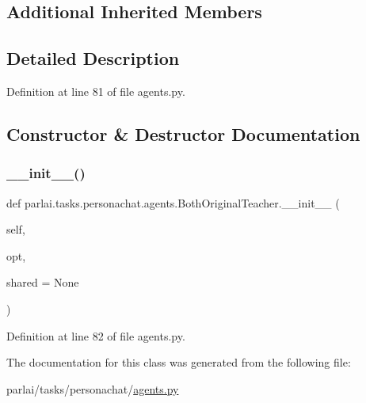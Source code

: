 \subsection*{Additional Inherited Members}


\subsection{Detailed Description}


Definition at line 81 of file agents.\+py.



\subsection{Constructor \& Destructor Documentation}
\mbox{\label{classparlai_1_1tasks_1_1personachat_1_1agents_1_1BothOriginalTeacher_a9d8162c6d1b012a1c9961f0aaedcb9cf}} 
\subsubsection{\texorpdfstring{\+\_\+\+\_\+init\+\_\+\+\_\+()}{\_\_init\_\_()}}
{\footnotesize\ttfamily def parlai.\+tasks.\+personachat.\+agents.\+Both\+Original\+Teacher.\+\_\+\+\_\+init\+\_\+\+\_\+ (\begin{DoxyParamCaption}\item[{}]{self,  }\item[{}]{opt,  }\item[{}]{shared = {\ttfamily None} }\end{DoxyParamCaption})}



Definition at line 82 of file agents.\+py.



The documentation for this class was generated from the following file\+:\begin{DoxyCompactItemize}
\item 
parlai/tasks/personachat/\hyperlink{parlai_2tasks_2personachat_2agents_8py}{agents.\+py}\end{DoxyCompactItemize}

